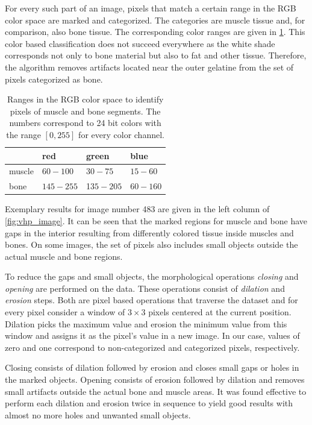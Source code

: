 For every such part of an image, pixels that match a certain range in the RGB color space are marked and categorized. The categories are muscle tissue and, for comparison, also bone tissue. The corresponding color ranges are given in \cref{tab:color_ranges}.
This color based classification does not succeed everywhere as the white shade corresponds not only to bone material but also to fat and other tissue. Therefore, the algorithm removes artifacts located near the outer gelatine from the set of pixels categorized as bone. 

\begin{table}
  \centering%
  \begin{tabular}{l|lll}
    \hline
    & red & green & blue\\
    \hline
    muscle & $60 - 100$& $30-75$   & $15-60$\\
    bone   & $145-255$ & 1$35-205$ & $60-160$\\
    \hline
  \end{tabular}
  \caption{Ranges in the RGB color space to identify pixels of muscle and bone segments. The numbers correspond to 24 bit colors with the range $[0,255]$ for every color channel.}%
  \label{tab:color_ranges}%
\end{table}

Exemplary results for image number 483 are given in the left column of \cref{fig:vhp_image}.
It can be seen that the marked regions for muscle and bone have gaps in the interior resulting from differently colored tissue inside muscles and bones. On some images, the set of pixels also includes small objects outside the actual muscle and bone regions.

To reduce the gaps and small objects, the morphological operations \emph{closing} and \emph{opening} are performed on the data. These operations consist of \emph{dilation} and \emph{erosion} steps. Both are pixel based operations that traverse the dataset and for every pixel consider a window of $3\times 3$ pixels centered at the current position. Dilation picks the maximum value and erosion the minimum value from this window and assigns it as the pixel's value in a new image. In our case, values of zero and one correspond to non-categorized and categorized pixels, respectively.

Closing consists of dilation followed by erosion and closes small gaps or holes in the marked objects. Opening consists of erosion followed by dilation and removes small artifacts outside the actual bone and muscle areas. It was found effective to perform each dilation and erosion twice in sequence to yield good results with almost no more holes and unwanted small objects.

